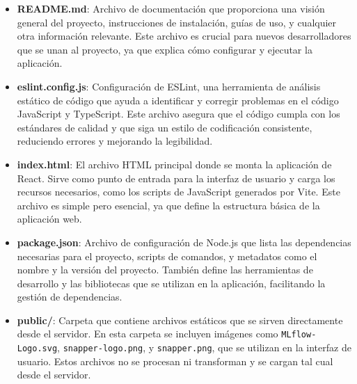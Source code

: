 \begin{itemize}
    \item \textbf{README.md}: Archivo de documentación que proporciona una visión general del proyecto, instrucciones de instalación, guías de uso, y cualquier otra información relevante. Este archivo es crucial para nuevos desarrolladores que se unan al proyecto, ya que explica cómo configurar y ejecutar la aplicación.
    \item \textbf{eslint.config.js}: Configuración de ESLint, una herramienta de análisis estático de código que ayuda a identificar y corregir problemas en el código JavaScript y TypeScript. Este archivo asegura que el código cumpla con los estándares de calidad y que siga un estilo de codificación consistente, reduciendo errores y mejorando la legibilidad.

    \item \textbf{index.html}: El archivo HTML principal donde se monta la aplicación de React. Sirve como punto de entrada para la interfaz de usuario y carga los recursos necesarios, como los scripts de JavaScript generados por Vite. Este archivo es simple pero esencial, ya que define la estructura básica de la aplicación web.

    \item \textbf{package.json}: Archivo de configuración de Node.js que lista las dependencias necesarias para el proyecto, scripts de comandos, y metadatos como el nombre y la versión del proyecto. También define las herramientas de desarrollo y las bibliotecas que se utilizan en la aplicación, facilitando la gestión de dependencias.

    \item \textbf{public/}: Carpeta que contiene archivos estáticos que se sirven directamente desde el servidor. En esta carpeta se incluyen imágenes como \texttt{MLflow-Logo.svg}, \texttt{snapper-logo.png}, y \texttt{snapper.png}, que se utilizan en la interfaz de usuario. Estos archivos no se procesan ni transforman y se cargan tal cual desde el servidor.


\end{itemize}
